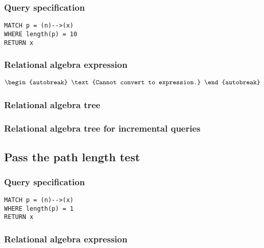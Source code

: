 \subsubsection*{Query specification}

\begin{lstlisting}
MATCH p = (n)-->(x)
WHERE length(p) = 10
RETURN x
\end{lstlisting}

\subsubsection*{Relational algebra expression}

\begin{align*}
\begin{autobreak}
\text{Cannot convert to expression.}
\end{autobreak}
\end{align*}

\subsubsection*{Relational algebra tree}


\subsubsection*{Relational algebra tree for incremental queries}


\subsection{Pass the path length test}

\subsubsection*{Query specification}

\begin{lstlisting}
MATCH p = (n)-->(x)
WHERE length(p) = 1
RETURN x
\end{lstlisting}

\subsubsection*{Relational algebra expression}

